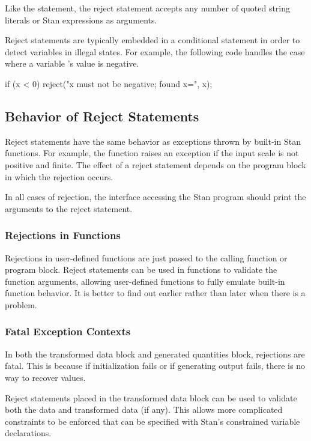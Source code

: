 Like the  statement, the reject statement accepts
any number of quoted string literals or Stan expressions as arguments.

Reject statements are typically embedded in a conditional
statement in order to detect variables in illegal states.  For
example, the following code handles the case where a variable 's
value is negative.
%
\begin{stancode}
if (x < 0)
  reject("x must not be negative; found x=", x);
\end{stancode}

\subsection{Behavior of Reject Statements}

Reject statements have the same behavior as exceptions thrown by
built-in Stan functions.  For example, the  function
raises an exception if the input scale is not positive and finite.
The effect of a reject statement depends on the program block in which
the rejection occurs.

In all cases of rejection, the interface accessing the Stan
program should print the arguments to the reject statement.

\subsubsection{Rejections in Functions}

Rejections in user-defined functions are just passed to the
calling function or program block.  Reject statements can be used in
functions to validate the function arguments, allowing user-defined
functions to fully emulate built-in function behavior.  It is better
to find out earlier rather than later when there is a problem.

\subsubsection{Fatal Exception Contexts}

In both the transformed data block and generated quantities block,
rejections are fatal.  This is because if initialization fails or if
generating output fails, there is no way to recover values.

Reject statements placed in the transformed data block can be used
to validate both the data and transformed data (if any).  This allows
more complicated constraints to be enforced that can be specified with
Stan's constrained variable declarations.


